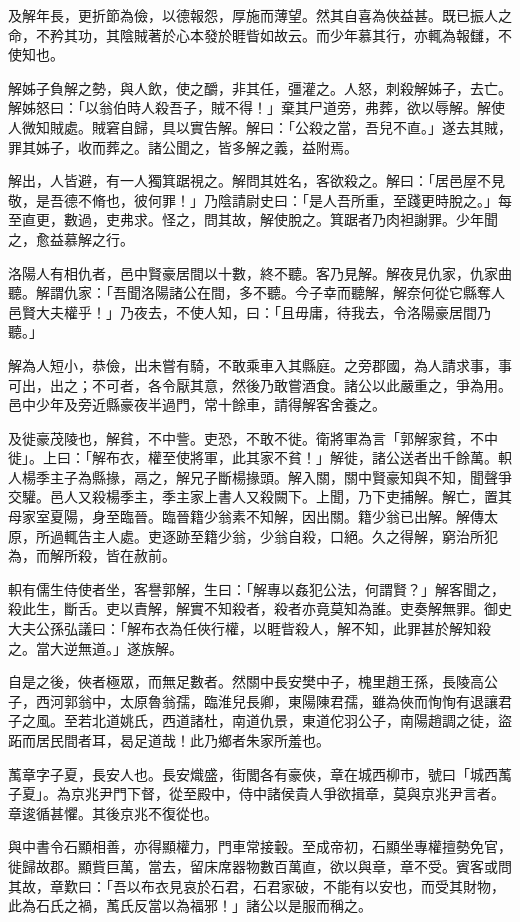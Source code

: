 \begin{pinyinscope}
及解年長，更折節為儉，以德報怨，厚施而薄望。然其自喜為俠益甚。既已振人之命，不矜其功，其陰賊著於心本發於睚眥如故云。而少年慕其行，亦輒為報讎，不使知也。

解姊子負解之勢，與人飲，使之釂，非其任，彊灌之。人怒，刺殺解姊子，去亡。解姊怒曰：「以翁伯時人殺吾子，賊不得！」棄其尸道旁，弗葬，欲以辱解。解使人微知賊處。賊窘自歸，具以實告解。解曰：「公殺之當，吾兒不直。」遂去其賊，罪其姊子，收而葬之。諸公聞之，皆多解之義，益附焉。

解出，人皆避，有一人獨箕踞視之。解問其姓名，客欲殺之。解曰：「居邑屋不見敬，是吾德不脩也，彼何罪！」乃陰請尉史曰：「是人吾所重，至踐更時脫之。」每至直更，數過，吏弗求。怪之，問其故，解使脫之。箕踞者乃肉袒謝罪。少年聞之，愈益慕解之行。

洛陽人有相仇者，邑中賢豪居間以十數，終不聽。客乃見解。解夜見仇家，仇家曲聽。解謂仇家：「吾聞洛陽諸公在間，多不聽。今子幸而聽解，解奈何從它縣奪人邑賢大夫權乎！」乃夜去，不使人知，曰：「且毋庸，待我去，令洛陽豪居間乃聽。」

解為人短小，恭儉，出未嘗有騎，不敢乘車入其縣庭。之旁郡國，為人請求事，事可出，出之；不可者，各令厭其意，然後乃敢嘗酒食。諸公以此嚴重之，爭為用。邑中少年及旁近縣豪夜半過門，常十餘車，請得解客舍養之。

及徙豪茂陵也，解貧，不中訾。吏恐，不敢不徙。衛將軍為言「郭解家貧，不中徙」。上曰：「解布衣，權至使將軍，此其家不貧！」解徙，諸公送者出千餘萬。軹人楊季主子為縣掾，鬲之，解兄子斷楊掾頭。解入關，關中賢豪知與不知，聞聲爭交驩。邑人又殺楊季主，季主家上書人又殺闕下。上聞，乃下吏捕解。解亡，置其母家室夏陽，身至臨晉。臨晉籍少翁素不知解，因出關。籍少翁已出解。解傳太原，所過輒告主人處。吏逐跡至籍少翁，少翁自殺，口絕。久之得解，窮治所犯為，而解所殺，皆在赦前。

軹有儒生侍使者坐，客譽郭解，生曰：「解專以姦犯公法，何謂賢？」解客聞之，殺此生，斷舌。吏以責解，解實不知殺者，殺者亦竟莫知為誰。吏奏解無罪。御史大夫公孫弘議曰：「解布衣為任俠行權，以睚眥殺人，解不知，此罪甚於解知殺之。當大逆無道。」遂族解。

自是之後，俠者極眾，而無足數者。然關中長安樊中子，槐里趙王孫，長陵高公子，西河郭翁中，太原魯翁孺，臨淮兒長卿，東陽陳君孺，雖為俠而恂恂有退讓君子之風。至若北道姚氏，西道諸杜，南道仇景，東道佗羽公子，南陽趙調之徒，盜跖而居民間者耳，曷足道哉！此乃鄉者朱家所羞也。

萭章字子夏，長安人也。長安熾盛，街閭各有豪俠，章在城西柳市，號曰「城西萭子夏」。為京兆尹門下督，從至殿中，侍中諸侯貴人爭欲揖章，莫與京兆尹言者。章逡循甚懼。其後京兆不復從也。

與中書令石顯相善，亦得顯權力，門車常接轂。至成帝初，石顯坐專權擅勢免官，徙歸故郡。顯貲巨萬，當去，留床席器物數百萬直，欲以與章，章不受。賓客或問其故，章歎曰：「吾以布衣見哀於石君，石君家破，不能有以安也，而受其財物，此為石氏之禍，萭氏反當以為福邪！」諸公以是服而稱之。


\end{pinyinscope}

